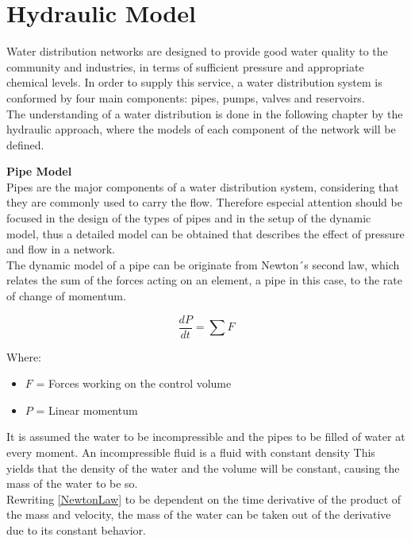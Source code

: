 \section{Hydraulic Model}
\label{HydraulicModel}

Water distribution networks are designed to provide good water quality to the community and industries, in 
terms of sufficient pressure and appropriate chemical levels. In order to supply this service, a water distribution 
system is conformed by four main components: pipes, pumps, valves and reservoirs. 
\\

The understanding of a water distribution is done in the following chapter by the hydraulic approach, 
where the models of each component of the network will be defined. 

\textbf{Pipe Model} \\ 
\label{PipeModel}
Pipes are the major components of a water distribution system, considering that they are commonly used to carry the flow. 
Therefore especial attention should be focused in the design of the types of pipes and in the setup of the dynamic model, 
thus a detailed model can be obtained that describes the effect of pressure and flow in a network. 
%
\\
The dynamic model of a pipe can be originate from Newton´s second law, which relates the sum of the 
forces acting on an element, a pipe in this case, to the rate of change of momentum.

\begin{equation}
  \frac{dP}{dt} = \sum F
  \label{NewtonLaw}
\end{equation} 

Where: 

\begin{itemize}
  \item  $F$ = Forces working on the control volume 
  \item $P$ = Linear momentum
\end{itemize}

It is assumed the water to be incompressible and the pipes to be filled of water at every moment. 
An incompressible fluid is a fluid with constant density
This yields that the density of the water and the volume will be constant, causing the mass of the water to be so. 
\\
Rewriting \ref{NewtonLaw} to be dependent on the time derivative of the product 
of the mass and velocity, the mass of the water can be taken out of the derivative due to its constant behavior.


